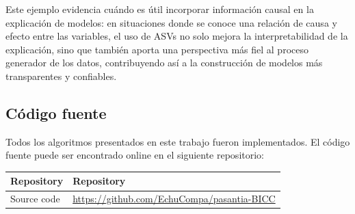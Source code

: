 Este ejemplo evidencia cuándo es útil incorporar información causal en la explicación de modelos: en situaciones donde se conoce una relación de causa y efecto entre las variables, el uso de ASVs no solo mejora la interpretabilidad de la explicación, sino que también aporta una perspectiva más fiel al proceso generador de los datos, contribuyendo así a la construcción de modelos más transparentes y confiables.




\subsection{Código fuente}

Todos los algoritmos presentados en este trabajo fueron implementados. El código fuente puede ser encontrado online en el siguiente repositorio: 

\begin{table}[H]
\centering
\begin{tabular}{ll}
\toprule
\textbf{Repository} & \textbf{Repository} \\
\midrule
Source code & \url{https://github.com/EchuCompa/pasantia-BICC} \\
\end{tabular}
\end{table}
